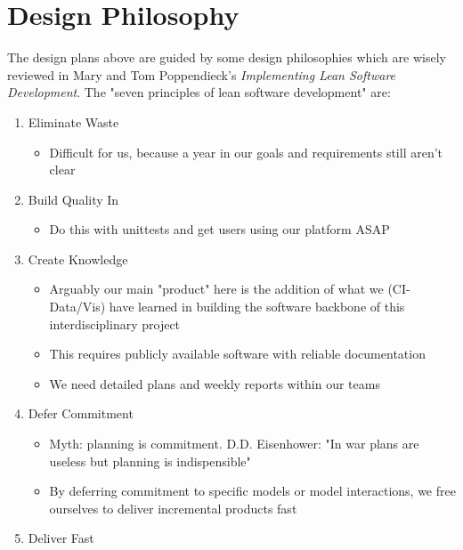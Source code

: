 \documentclass[
11pt, %
a4paper, %
oneside, %
twoside, %
headinclude,footinclude, %
BCOR5mm, %
]{scrartcl}
\begin{document}

\section{Design Philosophy} %
\label{sec:design_philosophies}
The design plans above are guided by some design philosophies which are wisely reviewed in 
Mary and Tom Poppendieck's \textit{Implementing Lean Software Development}. The "seven
principles of lean software development" are:

\begin{enumerate}
    \item Eliminate Waste
        \begin{itemize}
            \item Difficult for us, because a year in our goals and requirements still aren't clear
        \end{itemize}
    \item Build Quality In
        \begin{itemize}
            \item Do this with unittests and get users using our platform ASAP
        \end{itemize}
    \item Create Knowledge
        \begin{itemize}
            \item Arguably our main "product" here is the addition of what we (CI-Data/Vis) have 
                learned in building the software backbone of this interdisciplinary project
            \item This requires publicly available software with reliable documentation
            \item We need detailed plans and weekly reports within our teams
        \end{itemize}
    \item Defer Commitment
        \begin{itemize}
            \item Myth: planning is commitment. D.D. Eisenhower: "In war plans are useless but 
                planning is indispensible"
            \item By deferring commitment to specific models or model interactions, we free 
                ourselves to deliver incremental products fast
        \end{itemize}
    \item Deliver Fast
        \begin{itemize}

\end{itemize}
\end{enumerate}
\end{document}
